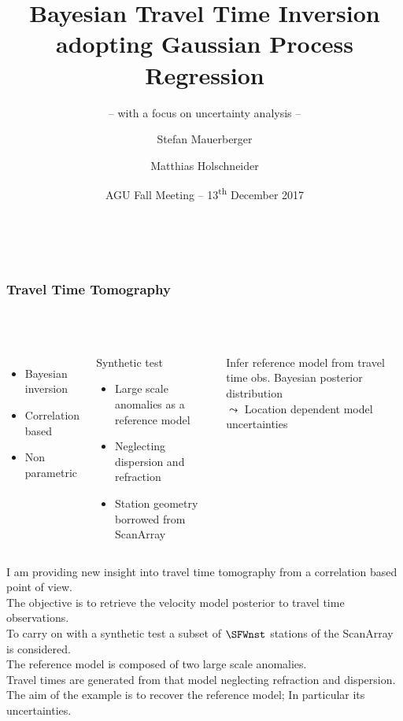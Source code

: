 \documentclass[aspectratio=169, t, 10pt,
    ignorenonframetext,
    ]{beamer}
\title[Correlation based travel time inversion]{Bayesian Travel Time Inversion adopting Gaussian Process Regression}
\subtitle{-- with a focus on uncertainty analysis --}
\author[\tt mauerber@uni-potsdam.de]{Stefan Mauerberger \and Matthias Holschneider}
\institute[Math@UP]{University Potsdam, Institute of Mathematics}
\date[AGU~2017]{AGU Fall Meeting -- 13\textsuperscript{th} December 2017}
\begin{document}

~

\begin{frame}
    \frametitle{Travel Time Tomography}
    \framesubtitle{~}%
%
\begin{columns}%
%
%
    \begin{itemize}
        \item Bayesian inversion
        \item Correlation based
        \item Non parametric
    \end{itemize}

    \begin{exampleblock}{Synthetic test}
        \begin{itemize}
            \item Large scale anomalies as a reference model
            \item Neglecting dispersion and refraction
            \item Station geometry borrowed from ScanArray
        \end{itemize}
    \end{exampleblock}

    \begin{alertblock}{Infer reference model from travel time obs.}
        Bayesian posterior distribution \\
        \hfill {\Large $\leadsto$} Location dependent model uncertainties ~
    \end{alertblock}

    \vspace{-10mm}
    
\end{columns}

\end{frame}

I am providing new insight into travel time tomography from a correlation based point of view.
\\
The objective is to retrieve the velocity model posterior to travel time observations.
\\[2mm]

To carry on with a synthetic test a subset of $\SFWnst$ stations of the ScanArray is considered.
\\
The reference model is composed of two large scale anomalies.
\\
Travel times are generated from that model neglecting refraction and dispersion.
\\
The aim of the example is to recover the reference model;
In particular its uncertainties.
\end{document}

